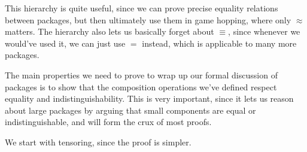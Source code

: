 This hierarchy is quite useful, since we can prove precise
equality relations between packages,
but then ultimately use them in game hopping,
where only $\approx$ matters.
The hierarchy also lets us basically forget about $\equiv$,
since whenever we would've used it, we can just use $=$ instead,
which is applicable to many more packages.

The main properties we need to prove to wrap up our formal discussion
of packages is to show that the composition operations we've
defined respect equality and indistinguishability.
This is very important, since it lets us reason about large
packages by arguing that small components are equal or indistinguishable,
and will form the crux of most proofs.

We start with tensoring, since the proof is simpler.

